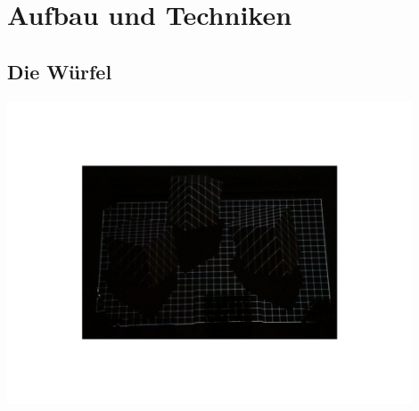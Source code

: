 \documentclass[pdftex,12pt,a4paper]{report}
\begin{document}
\section{Aufbau und Techniken}

\subsection{Die Würfel}

\includegraphics[width=0.9\textwidth]{./wuerfel_beamer}\\[0.3cm]   
\end{document}
